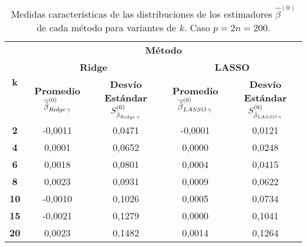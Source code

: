 \documentclass[a4paper,12pt]{report}
\begin{document}
\begin{table}[H]
\centering
\caption{Medidas características de las distribuciones de los estimadores $\hat{\beta}^{(0)}$ de cada método para variantes de $k$. Caso $p=2n=200$.}
\label{tab: sit 2 B 0 med std}
\footnotesize
\begin{tabular}{c|cc|cc}
\multirow{3}{*}[-2em]{\textbf{k}} & \multicolumn{4}{c}{\textbf{Método}} \\[2ex]
 & \multicolumn{2}{c}{\textbf{Ridge}} & \multicolumn{2}{c}{\textbf{LASSO}} \\[2ex]
 & \scriptsize\makecell{\textbf{Promedio} \\ $\overline{\hat{\beta}}_{Ridge \hspace{0.05cm} \gamma}^{(0)}$} & \scriptsize\makecell{\textbf{Desvío} \\ \textbf{Estándar} \\ $S_{\hat{\beta}_{Ridge \hspace{0.05cm} \gamma}}^{(0)}$} & \scriptsize\makecell{\textbf{Promedio} \\ $\overline{\hat{\beta}}_{LASSO \hspace{0.05cm} \gamma}^{(0)}$} & \scriptsize\makecell{\textbf{Desvío} \\ \textbf{Estándar} \\ $S_{\hat{\beta}_{LASSO \hspace{0.05cm} \gamma}}^{(0)}$} \\ \hline
\textbf{2} & -0,0011 & 0,0471 & -0,0001 & 0,0121 \\
\textbf{4} & \hspace{0.005cm} 0,0001 & 0,0652 & \hspace{0.005cm} 0,0000 & 0,0248 \\
\textbf{6} & \hspace{0.005cm} 0,0018 & 0,0801 & \hspace{0.005cm} 0,0004 & 0,0415 \\
\textbf{8} & \hspace{0.005cm} 0,0023 & 0,0931 & \hspace{0.005cm} 0,0009 & 0,0622 \\
\textbf{10} & -0,0010 & 0,1026 & \hspace{0.005cm} 0,0005 & 0,0734 \\
\textbf{15} & -0,0021 & 0,1279 & \hspace{0.005cm} 0,0000 & 0,1041 \\
\textbf{20} & \hspace{0.005cm} 0,0023 & 0,1482 & \hspace{0.005cm} 0,0014 & 0,1264 \\

\end{tabular}
\end{table}
\end{document}
